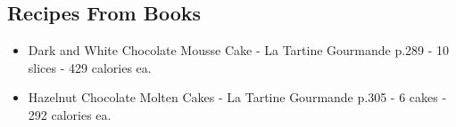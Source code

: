\subsection*{Recipes From Books}
\begin{itemize}
    \item Dark and White Chocolate Mousse Cake - La Tartine Gourmande p.289 - 10 slices - 429 calories ea.
    \item Hazelnut Chocolate Molten Cakes - La Tartine Gourmande p.305 - 6 cakes - 292 calories ea.
\end{itemize}